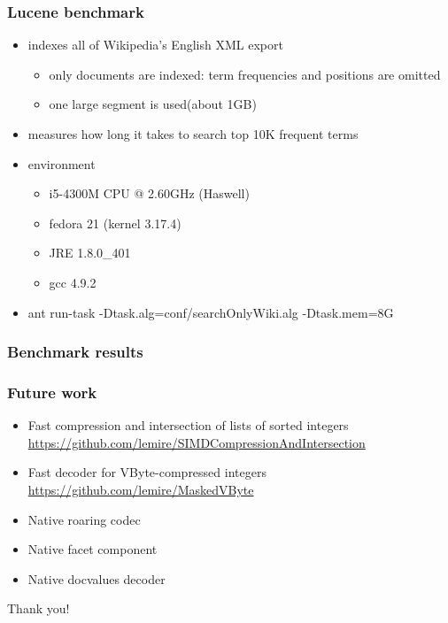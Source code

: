 \documentclass{beamer}
\newcommand\hugefont{\fontsize{36}{42.2}\selectfont}
\begin{document}
	\begin{frame}
		\frametitle{Lucene benchmark}
		\begin{itemize}
			\item indexes all of Wikipedia's English XML export
				\begin{itemize}
					\item only documents are indexed: term frequencies and positions are omitted
					\item one large segment is used(about 1GB)
				\end{itemize}
			\item measures how long it takes to search top 10K frequent terms
			\item environment
			\begin{itemize}
				\item i5-4300M CPU @ 2.60GHz (Haswell)
				\item fedora 21 (kernel 3.17.4)
				\item JRE 1.8.0\_401
				\item gcc 4.9.2 
			\end{itemize}
			\item ant run-task -Dtask.alg=conf/searchOnlyWiki.alg -Dtask.mem=8G
		\end{itemize}
	\end{frame}
	\begin{frame}
		\frametitle{Benchmark results}
		\begin{center}
  		\begin{bchart}[step=5,min=30,max=65,unit=s]
            \smallskip
            \smallskip
    		\end{bchart}
		\end{center}
	\end{frame}
	\begin{frame}
		\frametitle{Future work}
		\begin{itemize}
			\item Fast compression and intersection of lists of sorted integers \url{https://github.com/lemire/SIMDCompressionAndIntersection}
			\item Fast decoder for VByte-compressed integers \url{https://github.com/lemire/MaskedVByte}
			\item Native roaring codec
			\item Native facet component
			\item Native docvalues decoder
		\end{itemize}
	\end{frame}
	\begin{frame}
		\hugefont
		\begin{center}
		Thank you!
		\end{center}
	\end{frame}
\end{document}
